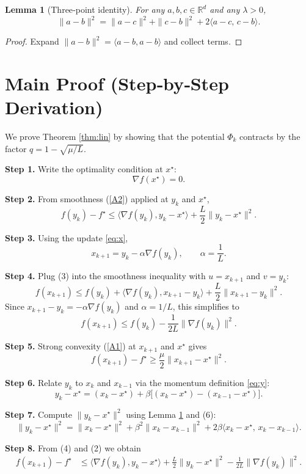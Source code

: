 \documentclass{article}
\newtheorem{lemma}{Lemma}
\newcommand{\grad}{\nabla}
\newcommand{\R}{\mathbb{R}}
\begin{document}
\begin{lemma}[Three‑point identity]\label{lem:three}
For any $a,b,c\in\R^d$ and any $\lambda>0$,
\[
\|a-b\|^2 = \|a-c\|^2 + \|c-b\|^2 + 2\langle a-c,\,c-b\rangle .
\]
\end{lemma}
\begin{proof}
Expand $\|a-b\|^2=\langle a-b,a-b\rangle$ and collect terms. \qedhere
\end{proof}

\section*{Main Proof (Step‑by‑Step Derivation)}
We prove Theorem \ref{thm:lin} by showing that the potential $\Phi_k$ contracts by the factor $q=1-\sqrt{\mu/L}$.

\bigskip
\noindent\textbf{Step 1.}  Write the optimality condition at $x^\star$:
\[
\grad f(x^\star)=0. \tag{1}
\]

\noindent\textbf{Step 2.}  From smoothness (\ref{A2}) applied at $y_k$ and $x^\star$,
\[
f(y_k)-f^\star \le \langle \grad f(y_k), y_k-x^\star\rangle +\frac{L}{2}\|y_k-x^\star\|^2 . \tag{2}
\]

\noindent\textbf{Step 3.}  Using the update \eqref{eq:x},
\[
x_{k+1}=y_k-\alpha\grad f(y_k),\qquad \alpha=\frac1L. \tag{3}
\]

\noindent\textbf{Step 4.}  Plug (3) into the smoothness inequality with $u=x_{k+1}$ and $v=y_k$:
\[
f(x_{k+1})\le f(y_k)+\langle\grad f(y_k),x_{k+1}-y_k\rangle+\frac{L}{2}\|x_{k+1}-y_k\|^2 .
\]
Since $x_{k+1}-y_k=-\alpha\grad f(y_k)$ and $\alpha=1/L$, this simplifies to
\[
f(x_{k+1})\le f(y_k)-\frac{1}{2L}\|\grad f(y_k)\|^2 . \tag{4}
\]

\noindent\textbf{Step 5.}  Strong convexity (\ref{A1}) at $x_{k+1}$ and $x^\star$ gives
\[
f(x_{k+1})-f^\star \ge \frac{\mu}{2}\|x_{k+1}-x^\star\|^2 . \tag{5}
\]

\noindent\textbf{Step 6.}  Relate $y_k$ to $x_k$ and $x_{k-1}$ via the momentum definition \eqref{eq:y}:
\[
y_k - x^\star = (x_k-x^\star)+\beta\bigl[(x_k-x^\star)-(x_{k-1}-x^\star)\bigr]. \tag{6}
\]

\noindent\textbf{Step 7.}  Compute $\|y_k-x^\star\|^2$ using Lemma \ref{lem:three} and (6):
\[
\|y_k-x^\star\|^2 = \|x_k-x^\star\|^2 +\beta^2\|x_k-x_{k-1}\|^2
+2\beta\langle x_k-x^\star,\,x_k-x_{k-1}\rangle . \tag{7}
\]

\noindent\textbf{Step 8.}  From (4) and (2) we obtain
\[
\begin{aligned}
f(x_{k+1})-f^\star 
&\le \langle\grad f(y_k),y_k-x^\star\rangle +\frac{L}{2}\|y_k-x^\star\|^2 -\frac{1}{2L}\|\grad f(y_k)\|^2 .
\end{aligned}
\tag{8}
\]
\end{document}
